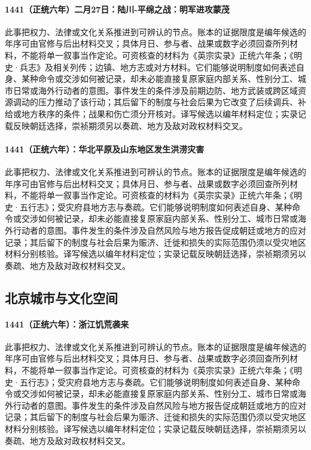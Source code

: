 \paragraph{1441（正统六年）二月27日：陆川-平绵之战：明军进攻蒙茂} 此事把权力、法律或文化关系推进到可辨认的节点。账本的证据限度是编年候选的年序可由官修与后出材料交叉；具体月日、参与者、战果或数字必须回查所列材料，不能将单一叙事当作定论。可资核查的材料为《英宗实录》正统六年条；《明史·兵志》及相关列传；边镇、地方志或对方材料。它们能够说明制度如何表述自身、某种命令或交涉如何被记录，却未必能直接复原家庭内部关系、性别分工、城市日常或海外行动者的意图。事件发生的条件涉及前期边防、地方武装或跨区域资源调动的压力推动了该行动；其后留下的制度与社会后果为它改变了后续调兵、补给或地方秩序的条件；战果和伤亡须分开核对。译写候选以编年材料定位；实录记载反映朝廷选择，崇祯期须另以奏疏、地方及敌对政权材料交叉。

\paragraph{1441（正统六年）：华北平原及山东地区发生洪涝灾害} 此事把权力、法律或文化关系推进到可辨认的节点。账本的证据限度是编年候选的年序可由官修与后出材料交叉；具体月日、参与者、战果或数字必须回查所列材料，不能将单一叙事当作定论。可资核查的材料为《英宗实录》正统六年条；《明史·五行志》；受灾府县地方志与奏疏。它们能够说明制度如何表述自身、某种命令或交涉如何被记录，却未必能直接复原家庭内部关系、性别分工、城市日常或海外行动者的意图。事件发生的条件涉及自然风险与地方报告促成朝廷或地方的应对记录；其后留下的制度与社会后果为赈济、迁徙和损失的实际范围仍须以受灾地区材料分别核验。译写候选以编年材料定位；实录记载反映朝廷选择，崇祯期须另以奏疏、地方及敌对政权材料交叉。

\subsection{北京城市与文化空间}

\paragraph{1441（正统六年）：浙江饥荒袭来} 此事把权力、法律或文化关系推进到可辨认的节点。账本的证据限度是编年候选的年序可由官修与后出材料交叉；具体月日、参与者、战果或数字必须回查所列材料，不能将单一叙事当作定论。可资核查的材料为《英宗实录》正统六年条；《明史·五行志》；受灾府县地方志与奏疏。它们能够说明制度如何表述自身、某种命令或交涉如何被记录，却未必能直接复原家庭内部关系、性别分工、城市日常或海外行动者的意图。事件发生的条件涉及自然风险与地方报告促成朝廷或地方的应对记录；其后留下的制度与社会后果为赈济、迁徙和损失的实际范围仍须以受灾地区材料分别核验。译写候选以编年材料定位；实录记载反映朝廷选择，崇祯期须另以奏疏、地方及敌对政权材料交叉。

